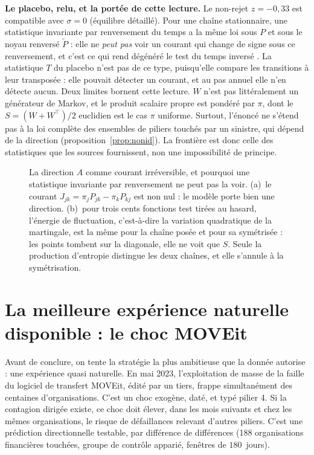 \begin{cle}
\textbf{Le placebo, relu, et la portée de cette lecture.} Le non-rejet $z=-0{,}33$ est
compatible avec $\sigma=0$ (équilibre détaillé). Pour une chaîne stationnaire, une statistique
invariante par renversement du temps a la même loi sous $P$ et sous le noyau renversé $\tilde P$ :
elle ne \emph{peut pas} voir un courant qui change de signe sous ce renversement, et c'est ce qui
rend dégénéré le test du \og temps inversé \fg{}. La statistique $T$ du placebo n'est pas de ce
type, puisqu'elle compare les transitions à leur transposée : elle pouvait détecter un courant, et
au pas annuel elle n'en détecte aucun. Deux limites bornent cette lecture. $W$ n'est pas
littéralement un générateur de Markov, et le produit scalaire propre est pondéré par $\pi$, dont le
$S=(W+W^\top)/2$ euclidien est le cas $\pi$ uniforme. Surtout, l'énoncé ne s'étend pas à la loi
complète des ensembles de piliers touchés par un sinistre, qui dépend de la direction
(proposition~\ref{prop:nonid}). La frontière est donc celle des statistiques que les sources
fournissent, non une impossibilité de principe.
\end{cle}

\begin{figure}[htbp]
  \centering
  \caption{La direction $A$ comme courant irréversible, et
pourquoi une statistique invariante par renversement ne peut pas la voir. (a)~le courant $J_{jk}=\pi_jP_{jk}-\pi_kP_{kj}$
est non nul : le modèle porte bien une direction. (b)~pour trois cents fonctions test tirées au
hasard, l'énergie de fluctuation, c'est-à-dire la variation quadratique de la martingale, est la
même pour la chaîne posée et pour sa symétrisée : les points tombent sur la diagonale, elle ne voit
que $S$. Seule la production d'entropie distingue les deux chaînes, et elle s'annule à la
symétrisation.}
  \label{fig:reversibilite}
\end{figure}

\section{La meilleure expérience naturelle disponible : le choc MOVEit}

Avant de conclure, on tente la stratégie la plus ambitieuse que la donnée autorise : une
expérience quasi naturelle. En mai 2023, l'exploitation de masse de la faille du logiciel de
transfert MOVEit, édité par un tiers, frappe simultanément des centaines
d'organisations. C'est un choc exogène, daté, et typé pilier 4. Si la
contagion dirigée existe, ce choc doit élever, dans les mois suivants et chez les mêmes
organisations, le risque de défaillances relevant d'autres piliers. C'est une prédiction
directionnelle testable, par différence de différences (188 organisations financières touchées,
groupe de contrôle apparié, fenêtres de $180$~jours).

